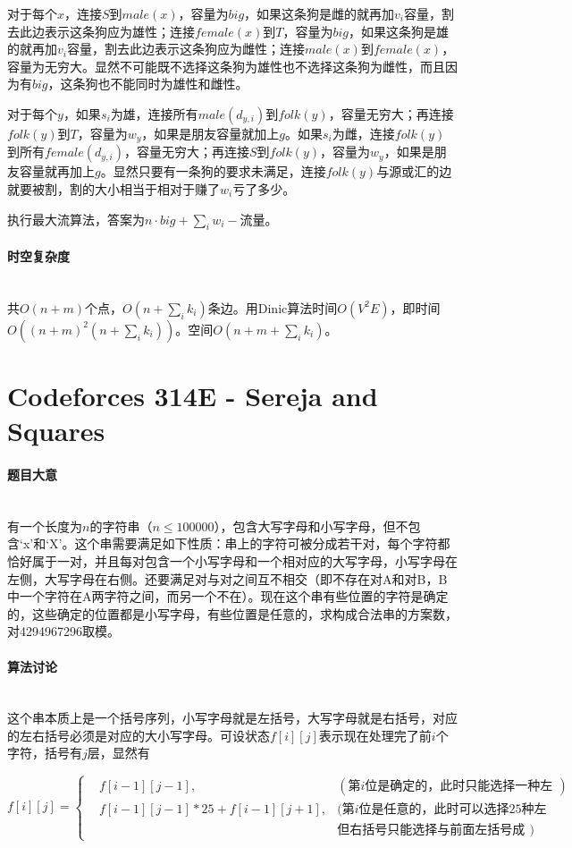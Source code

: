 \documentclass[UTF8]{ctexart}
\newcommand{\myparagraph}[1]{\paragraph{#1}\mbox{}\\}
\theoremstyle{nonumberplain}
\begin{document}
			对于每个$x$，连接$S$到$male(x)$，容量为$big$，如果这条狗是雌的就再加$v_i$容量，割去此边表示这条狗应为雄性；连接$female(x)$到$T$，容量为$big$，如果这条狗是雄的就再加$v_i$容量，割去此边表示这条狗应为雌性；连接$male(x)$到$female(x)$，容量为无穷大。显然不可能既不选择这条狗为雄性也不选择这条狗为雌性，而且因为有$big$，这条狗也不能同时为雄性和雌性。
			
			对于每个$y$，如果$s_i$为雄，连接所有$male(d_{y,i})$到$folk(y)$，容量无穷大；再连接$folk(y)$到$T$，容量为$w_y$，如果是朋友容量就加上$g$。如果$s_i$为雌，连接$folk(y)$到所有$female(d_{y,i})$，容量无穷大；再连接$S$到$folk(y)$，容量为$w_y$，如果是朋友容量就再加上$g$。显然只要有一条狗的要求未满足，连接$folk(y)$与源或汇的边就要被割，割的大小相当于相对于赚了$w_i$亏了多少。
			
			执行最大流算法，答案为$n \cdot big + \sum_i w_i - \mbox{流量}$。
		
		\myparagraph{时空复杂度}
		
			共$O(n+m)$个点，$O(n+\sum_i k_i)$条边。用Dinic算法时间$O(V^2E)$，即时间$O((n+m)^2(n+\sum_i k_i))$。空间$O(n+m+\sum_i k_i)$。
	
	\section{Codeforces 314E - Sereja and Squares}
	
		\myparagraph{题目大意}
		
			有一个长度为$n$的字符串（$n \leq 100000$），包含大写字母和小写字母，但不包含‘x’和‘X’。这个串需要满足如下性质：串上的字符可被分成若干对，每个字符都恰好属于一对，并且每对包含一个小写字母和一个相对应的大写字母，小写字母在左侧，大写字母在右侧。还要满足对与对之间互不相交（即不存在对A和对B，B中一个字符在A两字符之间，而另一个不在）。现在这个串有些位置的字符是确定的，这些确定的位置都是小写字母，有些位置是任意的，求构成合法串的方案数，对4294967296取模。
			
		\myparagraph{算法讨论}
		
			这个串本质上是一个括号序列，小写字母就是左括号，大写字母就是右括号，对应的左右括号必须是对应的大小写字母。可设状态$f[i][j]$表示现在处理完了前$i$个字符，括号有$j$层，显然有
			
			$$f[i][j]=\left\{\begin{aligned}
				&f[i-1][j-1], &(\mbox{第$i$位是确定的，此时只能选择一种左括号})\\
				&f[i-1][j-1]*25+f[i-1][j+1], &(\mbox{第$i$位是任意的，此时可以选择25种左括号，}\\
				&							 &\mbox{但右括号只能选择与前面左括号成对的一种})
			\end{aligned}\right.$$
			
\end{document}
